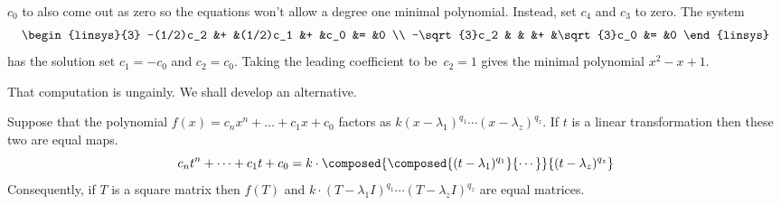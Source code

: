 \begin{example}
\( c_0 \) to also come out as zero
so the equations won't allow a degree one minimal polynomial.
Instead, set \( c_4 \) and \( c_3 \) to zero.
The system
\begin{equation*}
  \begin{linsys}{3}           
         -(1/2)c_2
         &+ &(1/2)c_1  
         &+  &c_0  &=  &0      \\
         -\sqrt{3}c_2
         &  &    
         &+ &\sqrt{3}c_0 &=  &0
   \end{linsys} 
\end{equation*}
has the solution set \( c_1=-c_0 \) and \( c_2=c_0 \).
Taking the leading coefficient to be~\( c_2=1 \) 
gives the minimal polynomial $x^2-x+1$. 
\end{example}

That computation is ungainly.
We shall develop an alternative.

\begin{lemma} \label{le:PolyMapsFactor}
Suppose that the polynomial \( f(x)=c_nx^n+\dots+c_1x+c_0 \) factors as
\( k(x-\lambda_1)^{q_1}\cdots(x-\lambda_z)^{q_z} \).
If \( t \) is a linear transformation then these two are equal maps. 
\begin{equation*}
  c_nt^n+\dots+c_1t+c_0
  =
  k\cdot\composed{\composed{(t-\lambda_1)^{q_1}}{\cdots}}{
      (t-\lambda_z)^{q_z}} 
\end{equation*}
Consequently, if \( T \) is a square matrix then \( f(T) \) and
\( k\cdot(T-\lambda_1I)^{q_1}\cdots(T-\lambda_z I)^{q_z} \) 
are equal matrices.
\end{lemma}

